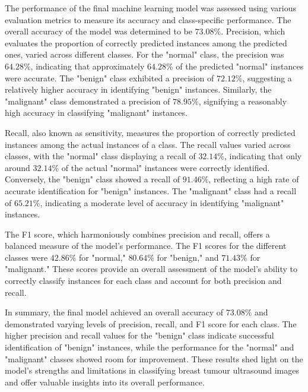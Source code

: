 The performance of the final machine learning model was assessed using various evaluation metrics to measure its accuracy and class-specific performance. The overall accuracy of the model was determined to be $73.08\%$. Precision, which evaluates the proportion of correctly predicted instances among the predicted ones, varied across different classes. For the "normal" class, the precision was $64.28\%$, indicating that approximately $64.28\%$ of the predicted "normal" instances were accurate. The "benign" class exhibited a precision of $72.12\%$, suggesting a relatively higher accuracy in identifying "benign" instances. Similarly, the "malignant" class demonstrated a precision of $78.95\%$, signifying a reasonably high accuracy in classifying "malignant" instances.

Recall, also known as sensitivity, measures the proportion of correctly predicted instances among the actual instances of a class. The recall values varied across classes, with the "normal" class displaying a recall of $32.14\%$, indicating that only around $32.14\%$ of the actual "normal" instances were correctly identified. Conversely, the "benign" class showed a recall of $91.46\%$, reflecting a high rate of accurate identification for "benign" instances. The "malignant" class had a recall of $65.21\%$, indicating a moderate level of accuracy in identifying "malignant" instances.

The F1 score, which harmoniously combines precision and recall, offers a balanced measure of the model's performance. The F1 scores for the different classes were $42.86\%$ for "normal," $80.64\%$ for "benign," and $71.43\%$ for "malignant." These scores provide an overall assessment of the model's ability to correctly classify instances for each class and account for both precision and recall.

In summary, the final model achieved an overall accuracy of $73.08\%$ and demonstrated varying levels of precision, recall, and F1 score for each class. The higher precision and recall values for the "benign" class indicate successful identification of "benign" instances, while the performance for the "normal" and "malignant" classes showed room for improvement. These results shed light on the model's strengths and limitations in classifying breast tumour ultrasound images and offer valuable insights into its overall performance.

